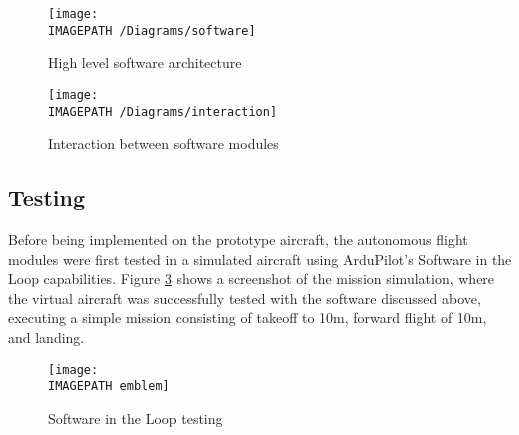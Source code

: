 

\begin{figure}[!ht]
	\centering
	\texttt{[image: \\IMAGEPATH /Diagrams/software]}
	\caption{High level software architecture}
	\label{fig:softwarearchitecture}
\end{figure}

\begin{figure}[!ht]
	\centering
	\texttt{[image: \\IMAGEPATH /Diagrams/interaction]}
	\caption{Interaction between software modules}
	\label{fig:softwareinteraction}
\end{figure}

\subsection{Testing}
Before being implemented on the prototype aircraft, the autonomous flight modules were first tested in a simulated aircraft using ArduPilot's Software in the Loop capabilities\cite{ref:sitl}. Figure \ref{fig:sitl} shows a screenshot of the mission simulation, where the virtual aircraft was successfully tested with the software discussed above, executing a simple mission consisting of takeoff to 10m, forward flight of 10m, and landing.

\begin{figure}[!ht]
	\centering
	\texttt{[image: \\IMAGEPATH emblem]}
	\caption{Software in the Loop testing}
	\label{fig:sitl}
\end{figure}